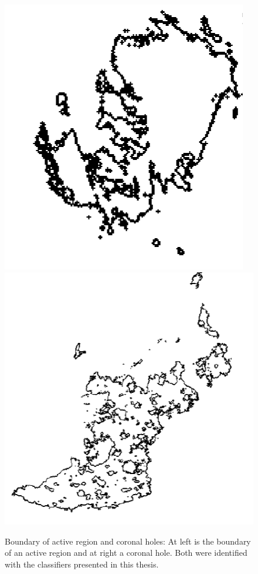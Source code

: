 \documentclass[twoside]{report}
\begin{document}
\begin{figure}[ht]
  \begin{center}
    \includegraphics[scale=0.4]{active_region_boundary}
    \includegraphics[scale=0.4]{coronal_hole_boundary}
    \caption{{Boundary of active region and coronal holes}: At left is the boundary of an active region and at right a coronal hole. Both were identified with the classifiers presented in this thesis.} 
    \label{fig:boundaries}
 \end{center}
\end{figure}
\end{document}
